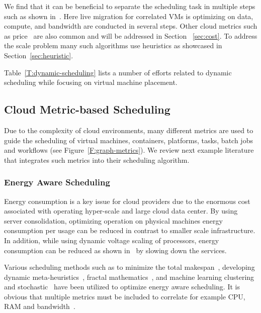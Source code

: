 \documentclass[final,5p,times,twocolumn]{elsarticle}
\begin{document}
We find that it can be beneficial to separate the scheduling task in
multiple steps such as shown in~\cite{sun2015live}. Here live
migration for correlated VMs is optimizing on data, compute, and
bandwidth are conducted in several steps. Other cloud metrics such as
price~\cite{tordsson2012cloud} are also common and will be addressed
in Section ~\ref{sec:cost}.  To address the scale problem many such
algorithms use heuristics as showcased in Section~\ref{sec:heuristic}.

Table~\ref{T:dynamic-scheduling} lists a number of efforts related to
dynamic scheduling while focusing on virtual machine placement.






\subsection{Cloud Metric-based Scheduling}\label{sec:vm-scheduling}

Due to the complexity of cloud environments, many different metrics
are used to guide the scheduling of virtual machines, containers,
platforms, tasks, batch jobs and workflows (see
Figure~\ref{F:graph-metrics}). We review next example literature that
integrates such metrics into their scheduling algorithm.


% 



\subsubsection{Energy Aware Scheduling}\label{sec:energy}



Energy consumption is a key issue for cloud providers due to the
enormous cost associated with operating hyper-scale and large cloud
data center. By using server consolidation, optimizing operation on
physical machines energy consumption per usage can be reduced in
contrast to smaller scale infrastructure.  In addition, while using
dynamic voltage scaling of processors, energy consumption can be
reduced as shown in~\cite{las09dvfs,las10dvfs,calheiros2014energy} by
slowing down the services.

Various scheduling methods such as to minimize the total
makespan~\cite{bessis2013using}, developing dynamic
meta-heuristics~\cite{bi2017application}, fractal
mathematics~\cite{duan2016energy}, and machine learning clustering and
stochastic~\cite{bui2017energy} have been utilized to optimize energy
aware scheduling. It is obvious that multiple metrics must be included to correlate for
example CPU, RAM and bandwidth~\cite{zhu2017three}.
\end{document}
